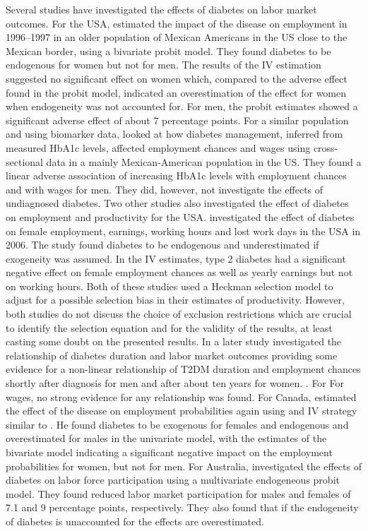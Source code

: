 \documentclass[12pt,english,british]{article}
\begin{document}
Several studies have investigated the effects of diabetes on labor market outcomes. For the USA, \citet{Brown2005}  estimated the impact of the disease on employment in 1996--1997 in an older population of Mexican Americans in the \ac{US} close to the Mexican border, using a bivariate probit model. They found diabetes to be endogenous for women but not for men. The results of the \ac{IV} estimation suggested no significant effect on women which, compared to the adverse effect found in the probit model, indicated an overestimation of the effect for women when endogeneity was not accounted for. For men, the probit estimates showed a significant adverse effect of about 7 percentage points. For a similar population and using biomarker data, \citet{BrownIII2011} looked at how diabetes management, inferred from measured \ac{HbA1c} levels,
affected employment chances and wages using cross-sectional data in
a mainly Mexican-American population in the US. They found a linear adverse association of increasing \ac{HbA1c} levels with
employment chances and with wages for men. They did, however, not investigate the effects of undiagnosed diabetes. Two other studies also investigated the effect of diabetes on employment and productivity for the USA. \citet{Minor2010} investigated the effect of diabetes on female employment, earnings, working hours and lost work days in the \ac{USA} in 2006. The study found diabetes to be endogenous and underestimated if exogeneity was assumed. In the \ac{IV} estimates, type 2 diabetes had a significant negative effect on female employment chances as well as yearly earnings but not on working hours. Both of these studies used a Heckman selection model to adjust for a possible selection bias in their estimates of productivity. However, both studies do not discuss the choice of exclusion restrictions which are crucial to identify the selection equation and for the validity of the results, at least casting some doubt on the presented results. In a later study \citet{Minor2013} investigated the relationship of diabetes duration and labor market outcomes providing  some evidence for a non-linear relationship of \ac{T2DM} duration and employment chances shortly after diagnosis for men and after about ten years for women. .  For  For wages, no strong evidence for any relationship was found.
For Canada, \citet{Latif2009} estimated the effect of the disease on employment probabilities again using and \ac{IV} strategy similar to \citet{Brown2005}. He found diabetes to be exogenous for females and endogenous and overestimated for males in the univariate model, with the estimates of the bivariate model indicating a significant negative impact on the employment probabilities for women, but not for men. 
For Australia, \cite{Zhang2009} investigated the effects of diabetes on labor force participation using a multivariate endogeneous probit model. They found reduced labor market participation for males and females of 7.1 and 9 percentage points, respectively. They also found that if the endogeneity of diabetes is unaccounted for the effects are overestimated. 
\end{document}
